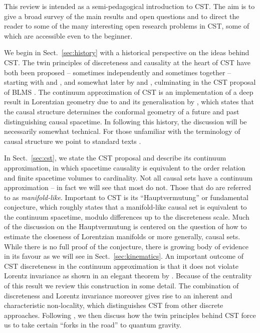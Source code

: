 This review is intended as a semi-pedagogical 
introduction to CST. The aim  is to give a broad survey of the
main results and open questions and  to direct the reader
to some of the many interesting open research problems in CST, some of which are
accessible even to the beginner.

We begin in
Sect.~\ref{sec:history} with a historical perspective 
on the ideas behind  CST. The
twin principles of discreteness and causality at the heart of
CST have both been proposed -- sometimes independently and sometimes together -- starting with
\cite{Riemann} and \cite{robbone,robbtwo},  and somewhat later by \cite{zeeman,kp,finkelstein,hemion} and \cite{myrheim}, 
culminating in the CST proposal of BLMS \citep{blms}. 
 The continuum approximation of CST is an implementation of a deep
result in Lorentzian geometry due to \cite{hkm}
and its generalisation by \cite{malament}, which states that the causal structure determines the conformal geometry of a future and past distinguishing
causal spacetime. In following this
history, the discussion will be necessarily somewhat technical. For those unfamiliar with the terminology of causal
structure we point to standard texts \citep{HE,BE,Wald,penrose}.

In Sect.~\ref{sec:cst}, we state the 
 CST proposal and describe its continuum approximation, in which spacetime causality is equivalent to the order relation
 and finite spacetime volumes to cardinality. Not all causal sets have a continuum approximation -- in fact we will see
 that most do not. Those that do are referred to as  \emph{manifold-like}. Important to CST is its
 ``Hauptvermutung'' or fundamental conjecture, which roughly states that a 
 manifold-like causal set is equivalent to the  continuum spacetime, modulo differences up to the discreteness scale. Much of the discussion on the Hauptvermutung is centered on
 the question of how to estimate the 
 closeness of Lorentzian manifolds or more generally,  causal sets. While there is no full proof of the  conjecture, there
 is growing body of  evidence in its favour as we will see in Sect.~\ref{sec:kinematics}. An important outcome of CST
 discreteness in the continuum approximation 
 is that it does not violate Lorentz invariance as shown in an elegant theorem by \cite{bomhensor}. Because of the centrality of this result we review this construction in some
 detail. The combination of discreteness and Lorentz invariance moreover gives rise to an inherent and characteristic
 non-locality, which distinguishes CST from other discrete approaches. Following \cite{lambdatwo}, we then discuss
 how the twin principles behind CST force us to take  certain ``forks in the road'' to quantum gravity.  


